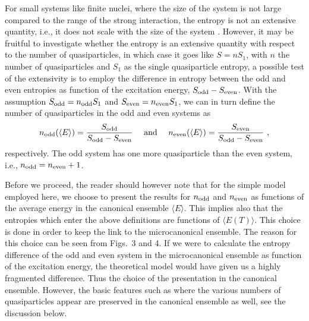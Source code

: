 For small systems like finite nuclei, where the size of the system is not large
compared to the range of the strong interaction, the entropy is not an extensive 
quantity, i.e., it does not scale with the size of the system \cite{gross99}.
However, it may be fruitful to investigate whether the entropy 
is an extensive quantity with respect to the number of quasiparticles,
in which case it goes like $S=nS_1$, with $n$ the number of 
quasiparticles and $S_1$ as the single quasiparticle
entropy, a possible test of the extensivity is to employ the
difference in entropy 
between the odd and even entropies as function of the excitation
energy, 
$S_{\rm odd} - S_{\rm even}$.
With the assumption $S_{\rm odd}=n_{\rm odd}S_1$ and $S_{\rm even}=n_{\rm even}S_1$, 
we can in turn define the  number of quasiparticles in the odd and even systems as 
\begin{equation}
      n_{\rm odd}(\langle E\rangle) = \frac{S_{\rm odd}}{S_{\rm odd} - S_{\rm even}} \ \ \ \ {\rm and} \ \ \ \ 
       n_{\rm even}(\langle E\rangle ) =\frac{S_{\rm even}}{S_{\rm odd} - S_{\rm even}} \ ,
       \label{eq:quasiparticle}
\end{equation}
respectively. The odd system has one more quasiparticle 
than the even system, i.e., $n_{\rm odd} = n_{\rm even} + 1$.

Before we proceed, the reader should however note that for the simple
model employed here, we choose to present the results for 
$n_{\rm odd}$ and $n_{\rm even}$ as functions of the average energy
in the canonical ensemble $\langle E\rangle$. This implies also that the 
entropies which enter the above definitions are  functions
of $\langle E(T)\rangle$. This choice is done in order to keep the link
to the microcanonical ensemble. 
 The reason for this choice can be seen from Figs.~3 and 4.
   If we were to calculate the entropy difference of the odd and even
   system in the microcanonical ensemble as function of the 
excitation energy, the theoretical model 
would have given us a highly fragmented difference. Thus the 
choice of the presentation in the canonical ensemble. However, the basic
   features such as where the various numbers of quasiparticles 
appear are preserved
in the canonical ensemble as well, see the discussion below.


